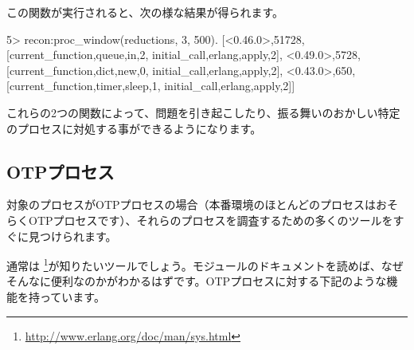 この関数が実行されると、次の様な結果が得られます。

\begin{VerbatimEshell}
5> recon:proc_window(reductions, 3, 500).
[{<0.46.0>,51728,
  [{current_function,{queue,in,2}},
   {initial_call,{erlang,apply,2}}]},
 {<0.49.0>,5728,
  [{current_function,{dict,new,0}},
   {initial_call,{erlang,apply,2}}]},
 {<0.43.0>,650,
  [{current_function,{timer,sleep,1}},
   {initial_call,{erlang,apply,2}}]}]
\end{VerbatimEshell}

これらの2つの関数によって、問題を引き起こしたり、振る舞いのおかしい特定のプロセスに対処する事ができるようになります。

\subsection{OTPプロセス}

対象のプロセスがOTPプロセスの場合（本番環境のほとんどのプロセスはおそらくOTPプロセスです）、それらのプロセスを調査するための多くのツールをすぐに見つけられます。

通常は \footnote{\href{http://www.erlang.org/doc/man/sys.html}{http://www.erlang.org/doc/man/sys.html}}が知りたいツールでしょう。モジュールのドキュメントを読めば、なぜそんなに便利なのかがわかるはずです。OTPプロセスに対する下記のような機能を持っています。

